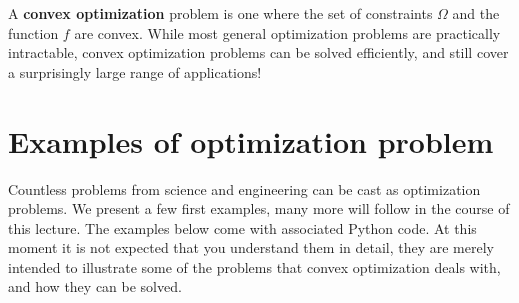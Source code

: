A \textbf{convex optimization} problem is one where the set of constraints $\Omega$ and the function $f$ are convex. While most general optimization problems are practically intractable, convex optimization problems can be solved efficiently, and still cover a surprisingly large range of applications!

\section{Examples of optimization problem}
Countless problems from science and engineering can be cast as optimization problems. We present a few first examples, many more will follow in the course of this lecture. The examples below come with associated Python code. At this moment it is not expected that you understand them in detail, they are merely intended to illustrate some of the problems that convex optimization deals with, and how they can be solved.

